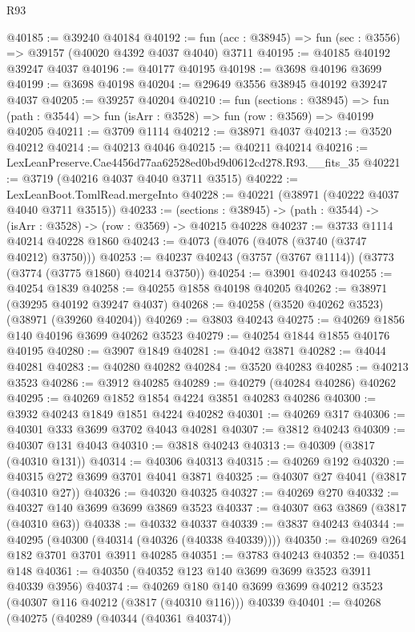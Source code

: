 \begin{lexlean}{R93}
\begin{coremodule}
@40185 := @39240 @40184
@40192 := fun (acc : @38945) => fun (sec : @3556) => @39157 (@40020 @4392 @4037 @4040) @3711
@40195 := @40185 @40192 @39247 @4037
@40196 := @40177 @40195
@40198 := @3698 @40196 @3699
@40199 := @3698 @40198
@40204 := @29649 @3556 @38945 @40192 @39247 @4037
@40205 := @39257 @40204
@40210 := fun (sections : @38945) =>
  fun (path : @3544) => fun (isArr : @3528) => fun (row : @3569) => @40199 @40205
@40211 := @3709 @1114
@40212 := @38971 @4037
@40213 := @3520 @40212
@40214 := @40213 @4046
@40215 := @40211 @40214
@40216 := LexLeanPreserve.Cae4456d77aa62528ed0bd9d0612cd278.R93.__fits_35
@40221 := @3719 (@40216 @4037 @4040 @3711 @3515)
@40222 := LexLeanBoot.TomlRead.mergeInto
@40228 := @40221 (@38971 (@40222 @4037 @4040 @3711 @3515))
@40233 := (sections : @38945) -> (path : @3544) -> (isArr : @3528) -> (row : @3569) -> @40215 @40228
@40237 := @3733 @1114 @40214 @40228 @1860
@40243 := @4073 (@4076 (@4078 (@3740 (@3747 @40212) @3750)))
@40253 := @40237 @40243 (@3757 (@3767 @1114)) (@3773 (@3774 (@3775 @1860) @40214 @3750))
@40254 := @3901 @40243
@40255 := @40254 @1839
@40258 := @40255 @1858 @40198 @40205
@40262 := @38971 (@39295 @40192 @39247 @4037)
@40268 := @40258 (@3520 @40262 @3523) (@38971 (@39260 @40204))
@40269 := @3803 @40243
@40275 := @40269 @1856 @140 @40196 @3699 @40262 @3523
@40279 := @40254 @1844 @1855 @40176 @40195
@40280 := @3907 @1849
@40281 := @4042 @3871
@40282 := @4044 @40281
@40283 := @40280 @40282
@40284 := @3520 @40283
@40285 := @40213 @3523
@40286 := @3912 @40285
@40289 := @40279 (@40284 @40286) @40262
@40295 := @40269 @1852 @1854 @4224 @3851 @40283 @40286
@40300 := @3932 @40243 @1849 @1851 @4224 @40282
@40301 := @40269 @317
@40306 := @40301 @333 @3699 @3702 @4043 @40281
@40307 := @3812 @40243
@40309 := @40307 @131 @4043
@40310 := @3818 @40243
@40313 := @40309 (@3817 (@40310 @131))
@40314 := @40306 @40313
@40315 := @40269 @192
@40320 := @40315 @272 @3699 @3701 @4041 @3871
@40325 := @40307 @27 @4041 (@3817 (@40310 @27))
@40326 := @40320 @40325
@40327 := @40269 @270
@40332 := @40327 @140 @3699 @3699 @3869 @3523
@40337 := @40307 @63 @3869 (@3817 (@40310 @63))
@40338 := @40332 @40337
@40339 := @3837 @40243
@40344 := @40295 (@40300 (@40314 (@40326 (@40338 @40339))))
@40350 := @40269 @264 @182 @3701 @3701 @3911 @40285
@40351 := @3783 @40243
@40352 := @40351 @148
@40361 := @40350 (@40352 @123 @140 @3699 @3699 @3523 @3911 @40339 @3956)
@40374 := @40269
    @180
    @140
    @3699
    @3699
    @40212
    @3523
    (@40307 @116 @40212 (@3817 (@40310 @116)))
    @40339
@40401 := @40268
    (@40275
      (@40289
        (@40344 (@40361 @40374))

\end{coremodule}
\end{lexlean}
